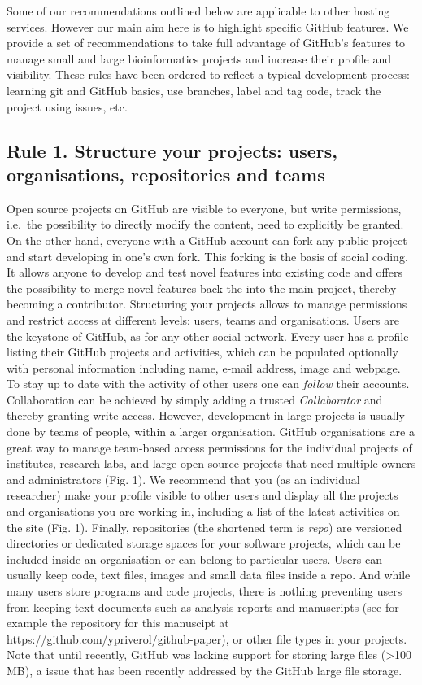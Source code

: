\documentclass[10pt,letterpaper]{article}
\begin{document}
Some of our recommendations outlined below are applicable to other
hosting services. However our main aim here is to highlight specific
GitHub features. We provide a set of recommendations to take full
advantage of GitHub's features to manage small and large bioinformatics
projects and increase their profile and visibility. These rules have
been ordered to reflect a typical development process: learning git and
GitHub basics, use branches, label and tag code, track the project using
issues, etc.

\subsection*{Rule 1. Structure your projects: users, organisations,
repositories and
teams}\label{rule-1.-structure-your-projects-users-organisations-repositories-and-teams}

Open source projects on GitHub are visible to everyone, but write
permissions, i.e.~the possibility to directly modify the content, need
to explicitly be granted. On the other hand, everyone with a GitHub
account can fork any public project and start developing in one's own
fork. This forking is the basis of social coding. It allows anyone to
develop and test novel features into existing code and offers the
possibility to merge novel features back the into the main project,
thereby becoming a contributor. Structuring your projects allows to
manage permissions and restrict access at different levels: users, teams
and organisations. Users are the keystone of GitHub, as for any other
social network. Every user has a profile listing their GitHub projects
and activities, which can be populated optionally with personal
information including name, e-mail address, image and webpage. To stay
up to date with the activity of other users one can \emph{follow} their
accounts. Collaboration can be achieved by simply adding a trusted
\emph{Collaborator} and thereby granting write access. However,
development in large projects is usually done by teams of people, within
a larger organisation. GitHub organisations are a great way to manage
team-based access permissions for the individual projects of institutes,
research labs, and large open source projects that need multiple owners
and administrators (Fig. 1). We recommend that you (as an individual
researcher) make your profile visible to other users and display all the
projects and organisations you are working in, including a list of the
latest activities on the site (Fig. 1). Finally, repositories (the
shortened term is \emph{repo}) are versioned directories or dedicated
storage spaces for your software projects, which can be included inside
an organisation or can belong to particular users. Users can usually
keep code, text files, images and small data files inside a repo. And
while many users store programs and code projects, there is nothing
preventing users from keeping text documents such as analysis reports
and manuscripts (see for example the repository for this manuscipt at
https://github.com/ypriverol/github-paper), or other file types in your
projects. Note that until recently, GitHub was lacking support for
storing large files (\textgreater{}100 MB), a issue that has been
recently addressed by the GitHub large file storage.
\end{document}
